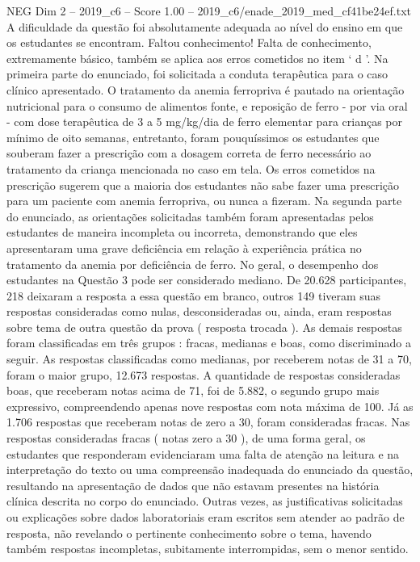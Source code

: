\begin{textsample}{NEG Dim 2 – 2019\_c6 – Score 1.00 – 2019\_c6/enade\_2019\_med\_cf41be24ef.txt}
A dificuldade da questão foi absolutamente adequada ao nível do ensino em que os estudantes se encontram.
Faltou conhecimento!
Falta de conhecimento, extremamente básico, também se aplica aos erros cometidos no item ‘ d ’.
Na primeira parte do enunciado, foi solicitada a conduta terapêutica para o caso clínico apresentado.
O tratamento da anemia ferropriva é pautado na orientação nutricional para o consumo de alimentos fonte, e reposição de ferro - por via oral - com dose terapêutica de 3 a 5 mg/kg/dia de ferro elementar para crianças por mínimo de oito semanas, entretanto, foram pouquíssimos os estudantes que souberam fazer a prescrição com a dosagem correta de ferro necessário ao tratamento da criança mencionada no caso em tela.
Os erros cometidos na prescrição sugerem que a maioria dos estudantes não sabe fazer uma prescrição para um paciente com anemia ferropriva, ou nunca a fizeram.
Na segunda parte do enunciado, as orientações solicitadas também foram apresentadas pelos estudantes de maneira incompleta ou incorreta, demonstrando que eles apresentaram uma grave deficiência em relação à experiência prática no tratamento da anemia por deficiência de ferro.
No geral, o desempenho dos estudantes na Questão 3 pode ser considerado mediano.
De 20.628 participantes, 218 deixaram a resposta a essa questão em branco, outros 149 tiveram suas respostas consideradas como nulas, desconsideradas ou, ainda, eram respostas sobre tema de outra questão da prova ( resposta trocada ).
As demais respostas foram classificadas em três grupos : fracas, medianas e boas, como discriminado a seguir.
As respostas classificadas como medianas, por receberem notas de 31 a 70, foram o maior grupo, 12.673 respostas.
A quantidade de respostas consideradas boas, que receberam notas acima de 71, foi de 5.882, o segundo grupo mais expressivo, compreendendo apenas nove respostas com nota máxima de 100.
Já as 1.706 respostas que receberam notas de zero a 30, foram consideradas fracas.
Nas respostas consideradas fracas ( notas zero a 30 ), de uma forma geral, os estudantes que responderam evidenciaram uma falta de atenção na leitura e na interpretação do texto ou uma compreensão inadequada do enunciado da questão, resultando na apresentação de dados que não estavam presentes na história clínica descrita no corpo do enunciado.
Outras vezes, as justificativas solicitadas ou explicações sobre dados laboratoriais eram escritos sem atender ao padrão de resposta, não revelando o pertinente conhecimento sobre o tema, havendo também respostas incompletas, subitamente interrompidas, sem o menor sentido.

\end{textsample}

